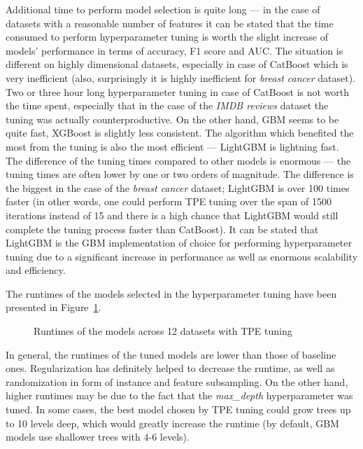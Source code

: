 \documentclass[magisterska, english]{pwr_wmat_praca_dyplomowa}
\theoremstyle{plain}
\numberwithin{theorem}{chapter}
\theoremstyle{definition}
\numberwithin{theorem}{chapter}
\begin{document}
Additional time to perform model selection is quite long --- in the case of datasets with a reasonable number of features it can be stated that the time consumed to perform hyperparameter tuning is worth the slight increase of models' performance in terms of accuracy, F1 score and AUC. The situation is different on highly dimensional datasets, especially in case of CatBoost which is very inefficient (also, surprisingly it is highly inefficient for \emph{breast cancer} dataset). Two or three hour long hyperparameter tuning in case of CatBoost is not worth the time spent, especially that in the case of the \emph{IMDB reviews} dataset the tuning was actually counterproductive. On the other hand, GBM seems to be quite fast, XGBoost is slightly less consistent. The algorithm which benefited the most from the tuning is also the most efficient --- LightGBM is lightning fast. The difference of the tuning times compared to other models is enormous --- the tuning times are often lower by one or two orders of magnitude. The difference is the biggest in the case of the \emph{breast cancer} dataset; LightGBM is over 100 times faster (in other words, one could perform TPE tuning over the span of 1500 iterations instead of 15 and there is a high chance that LightGBM would still complete the tuning process faster than CatBoost). It can be stated that LightGBM is the GBM implementation of choice for performing hyperparameter tuning due to a significant increase in performance as well as enormous scalability and efficiency.

The runtimes of the models selected in the hyperparameter tuning have been presented in Figure~\ref{fig:tpe_runtimes}.

\begin{figure}[H]
	\centering
	\caption{Runtimes of the models across 12 datasets with TPE tuning}
	\label{fig:tpe_runtimes}
\end{figure}

In general, the runtimes of the tuned models are lower than those of baseline ones. Regularization has definitely helped to decrease the runtime, as well as randomization in form of instance and feature subsampling. On the other hand, higher runtimes may be due to the fact that the \emph{max\_depth} hyperparameter was tuned. In some cases, the best model chosen by TPE tuning could grow trees up to 10 levels deep, which would greatly increase the runtime (by default, GBM models use shallower trees with 4-6 levels).
\end{document}
